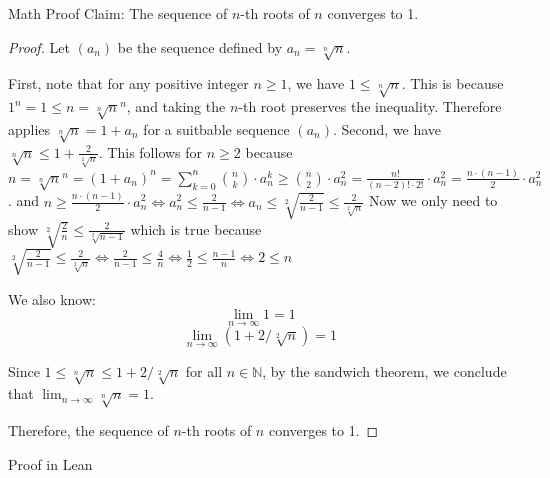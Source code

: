 \documentclass{beamer}
\begin{document}
\begin{frame}{Math Proof}
    Claim: The sequence of $n$-th roots of $n$ converges to 1.
    \begin{proof}
        Let $(a_n)$ be the sequence defined by $a_n = \sqrt[n]{n}$.

        First, note that for any positive integer $n \geq 1$, we have $1 \leq \sqrt[n]{n}$. This is because $1^n = 1 \leq n = \sqrt[n]{n}^n$, and taking the $n$-th root preserves the inequality. Therefore applies $\sqrt[n]{n} = 1 + a_n$ for a suitbable sequence $(a_n)$.
        Second, we have $\sqrt[n]{n} \leq 1 + \frac{2}{\sqrt[2]{n}}$. This follows for $n \geq 2$ because $n = \sqrt[n]{n}^n = (1 + a_n)^n = \sum_{k=0}^{n} \binom{n}{k} \cdot a_n^k \geq \binom{n}{2} \cdot a_n^2 = \frac{n!}{(n-2)! \cdot 2!} \cdot a_n^2 = \frac{n \cdot (n-1)}{2} \cdot a_n^2$. 
        and $n \geq \frac{n \cdot (n-1)}{2} \cdot a_n^2 \Leftrightarrow a_n^2 \leq \frac{2}{n-1} \Leftrightarrow a_n \leq \sqrt[2]{\frac{2}{n-1}} \leq \frac{2}{\sqrt[2]{n}}$
        Now we only need to show $\sqrt[2]{\frac{2}{n}} \leq \frac{2}{\sqrt[2]{n-1}}$ which is true because $\sqrt[2]{\frac{2}{n-1}} \leq \frac{2}{\sqrt[2]{n}} \Leftrightarrow \frac{2}{n-1} \leq \frac{4}{n} \Leftrightarrow \frac{1}{2} \leq \frac{n-1}{n} \Leftrightarrow 2 \leq n$

       We also know:
        \[
        \lim_{n \to \infty} 1 = 1
        \]
        \[
        \lim_{n \to \infty} (1 + 2 / \sqrt[2]{n}) = 1
        \]

        Since $1 \leq \sqrt[n]{n} \leq 1 + 2 / \sqrt[2]{n}$ for all $n \in \mathbb{N}$, by the sandwich theorem, we conclude that $\lim_{n \to \infty} \sqrt[n]{n} = 1$.

        Therefore, the sequence of $n$-th roots of $n$ converges to 1.
    \end{proof}

\end{frame} 

\begin{frame}{Proof in Lean}
\end{frame}
\end{document}
